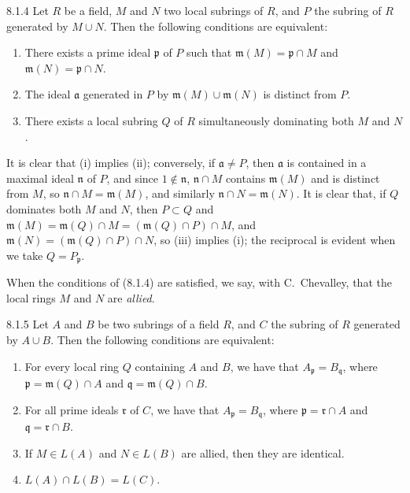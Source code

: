 \documentclass[../main.tex]{subfiles}
\begin{document}
\begin{env}[Lemma]{8.1.4}
    Let $R$ be a field, $M$ and $N$ two local subrings of $R$, and $P$ the subring of $R$ generated by $M\cup N$.
    Then the following conditions are equivalent:
    \begin{enumerate}[label=(\roman*)]
        \item There exists a prime ideal $\mathfrak{p}$ of $P$ such that $\mathfrak{m}(M)=\mathfrak{p}\cap M$ and $\mathfrak{m}(N)=\mathfrak{p}\cap N$.
        \item The ideal $\mathfrak{a}$ generated in $P$ by $\mathfrak{m}(M)\cup\mathfrak{m}(N)$ is distinct from $P$.
        \item There exists a local subring $Q$ of $R$ simultaneously dominating both $M$ and $N$.
    \end{enumerate}
\end{env}

It is clear that (i) implies (ii); conversely, if $\mathfrak{a}\neq P$, then $\mathfrak{a}$ is contained in a maximal ideal $\mathfrak{n}$ of $P$, and since $1\not\in\mathfrak{n}$, $\mathfrak{n}\cap M$ contains $\mathfrak{m}(M)$ and is distinct from $M$, so $\mathfrak{n}\cap M=\mathfrak{m}(M)$, and similarly $\mathfrak{n}\cap N=\mathfrak{m}(N)$.
It is clear that, if $Q$ dominates both $M$ and $N$, then $P\subset Q$ and $\mathfrak{m}(M)=\mathfrak{m}(Q)\cap M=(\mathfrak{m}(Q)\cap P)\cap M$, and $\mathfrak{m}(N)=(\mathfrak{m}(Q)\cap P)\cap N$, so (iii) implies (i); the reciprocal is evident when we take $Q=P_\mathfrak{p}$.

When the conditions of (8.1.4) are satisfied, we say, with C.~Chevalley, that the local rings $M$ and $N$ are \emph{allied}.

\begin{env}[Proposition]{8.1.5}
    Let $A$ and $B$ be two subrings of a field $R$, and $C$ the subring of $R$ generated by $A\cup B$.
    Then the following conditions are equivalent:
    \begin{enumerate}[label=(\roman*)]
        \item For every local ring $Q$ containing $A$ and $B$, we have that $A_\mathfrak{p}=B_\mathfrak{q}$, where $\mathfrak{p}=\mathfrak{m}(Q)\cap A$ and $\mathfrak{q}=\mathfrak{m}(Q)\cap B$.
        \item For all prime ideals $\mathfrak{r}$ of $C$, we have that $A_\mathfrak{p}=B_\mathfrak{q}$, where $\mathfrak{p}=\mathfrak{r}\cap A$ and $\mathfrak{q}=\mathfrak{r}\cap B$.
        \item If $M\in L(A)$ and $N\in L(B)$ are allied, then they are identical.
        \item $L(A)\cap L(B)=L(C)$.
    \end{enumerate}
\end{env}
\end{document}
